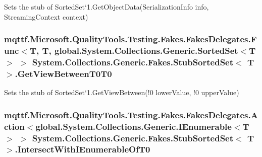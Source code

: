 Sets the stub of Sorted\-Set`1.Get\-Object\-Data(\-Serialization\-Info info, Streaming\-Context context)

\hypertarget{class_system_1_1_collections_1_1_generic_1_1_fakes_1_1_stub_sorted_set_3_01_t_01_4_a5def2947c56fc18b976599cea3eed8ac}{
\subsubsection[{Get\-View\-Between\-T0\-T0}]{\setlength{\rightskip}{0pt plus 5cm}mqttf.\-Microsoft.\-Quality\-Tools.\-Testing.\-Fakes.\-Fakes\-Delegates.\-Func$<$T, T, global.\-System.\-Collections.\-Generic.\-Sorted\-Set$<$T$>$ $>$ System.\-Collections.\-Generic.\-Fakes.\-Stub\-Sorted\-Set$<$ T $>$.Get\-View\-Between\-T0\-T0}}\label{class_system_1_1_collections_1_1_generic_1_1_fakes_1_1_stub_sorted_set_3_01_t_01_4_a5def2947c56fc18b976599cea3eed8ac}


Sets the stub of Sorted\-Set`1.Get\-View\-Between(!0 lower\-Value, !0 upper\-Value)

\hypertarget{class_system_1_1_collections_1_1_generic_1_1_fakes_1_1_stub_sorted_set_3_01_t_01_4_a5df9427683e21eec4e192d16be5013a2}{
\subsubsection[{Intersect\-With\-I\-Enumerable\-Of\-T0}]{\setlength{\rightskip}{0pt plus 5cm}mqttf.\-Microsoft.\-Quality\-Tools.\-Testing.\-Fakes.\-Fakes\-Delegates.\-Action$<$global.\-System.\-Collections.\-Generic.\-I\-Enumerable$<$T$>$ $>$ System.\-Collections.\-Generic.\-Fakes.\-Stub\-Sorted\-Set$<$ T $>$.Intersect\-With\-I\-Enumerable\-Of\-T0}}\label{class_system_1_1_collections_1_1_generic_1_1_fakes_1_1_stub_sorted_set_3_01_t_01_4_a5df9427683e21eec4e192d16be5013a2}


